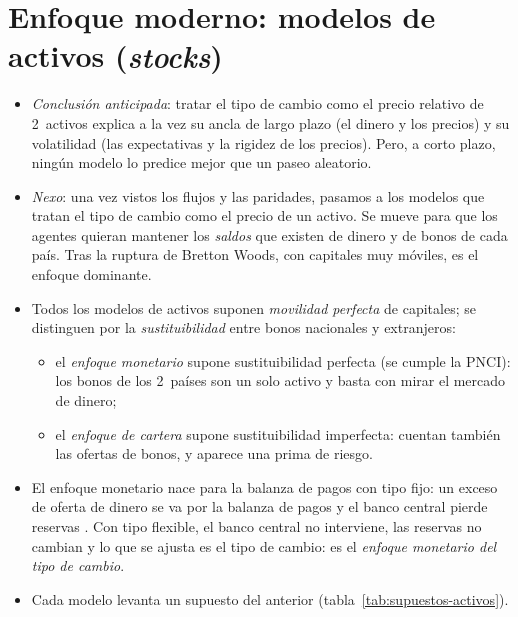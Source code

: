 \documentclass[11pt]{article}
\begin{document}
\section{Enfoque moderno: modelos de activos (\emph{stocks})}\label{sec:activos}

\begin{itemize}
\item \emph{Conclusión anticipada}: tratar el tipo de cambio como el precio relativo de 2~activos explica a la vez su ancla de largo plazo (el dinero y los precios) y su volatilidad (las expectativas y la rigidez de los precios). Pero, a corto plazo, ningún modelo lo predice mejor que un paseo aleatorio.
\item \emph{Nexo}: una vez vistos los flujos y las paridades, pasamos a los modelos que tratan el tipo de cambio como el precio de un activo. Se mueve para que los agentes quieran mantener los \emph{saldos} que existen de dinero y de bonos de cada país. Tras la ruptura de Bretton Woods, con capitales muy móviles, es el enfoque dominante.
\item Todos los modelos de activos suponen \emph{movilidad perfecta} de capitales; se distinguen por la \emph{sustituibilidad} entre bonos nacionales y extranjeros\nocite{Gandolfo2002International}:
  \begin{itemize}
  \item el \emph{enfoque monetario} supone sustituibilidad perfecta (se cumple la PNCI): los bonos de los 2~países son un solo activo y basta con mirar el mercado de dinero;
  \item el \emph{enfoque de cartera} supone sustituibilidad imperfecta: cuentan también las ofertas de bonos, y aparece una prima de riesgo.
  \end{itemize}
\item El enfoque monetario nace para la balanza de pagos con tipo fijo\nocite{FrenkelJohnson1976Monetary}: un exceso de oferta de dinero se va por la balanza de pagos y el banco central pierde reservas . Con tipo flexible, el banco central no interviene, las reservas no cambian y lo que se ajusta es el tipo de cambio: es el \emph{enfoque monetario del tipo de cambio}.
\item Cada modelo levanta un supuesto del anterior (tabla~\ref{tab:supuestos-activos}).
\end{itemize}
\end{document}
